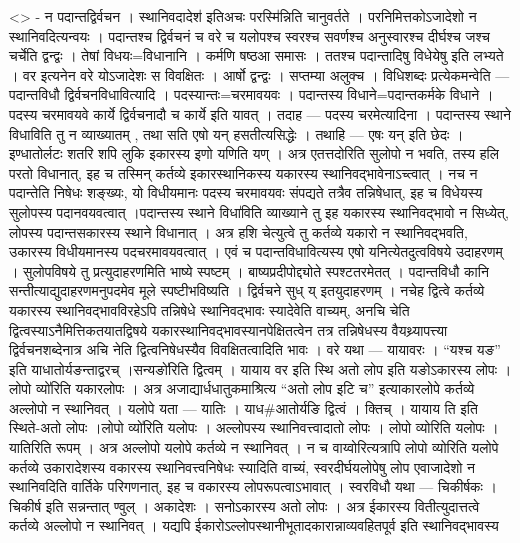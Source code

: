 \textless{}\textgreater{} - न पदान्तद्विर्वचन । स्थानिवदादेश॑ इतिअचः
परस्मि॑न्निति चानुवर्तते । परनिमित्तकोऽजादेशो न स्थानिवदित्यन्वयः ।
पदान्तश्च द्विर्वचनं च वरे च यलोपश्च स्वरश्च सवर्णश्च अनुस्वारश्च
दीर्घश्च जश्च चर्चेति द्वन्द्वः । तेषां विधयः=विधानानि । कर्मणि षष्ठआ
समासः । ततश्च पदान्तादिषु विधेयेषु इति लभ्यते । वर इत्यनेन वरे योऽजादेशः
स विवक्षितः । आर्षो द्वन्द्वः । सप्तम्या अलुक्च । विधिशब्दः
प्रत्येकमन्वेति --- पदान्तविधौ द्विर्वचनविधावित्यादि ।
पदस्यान्तः=चरमावयवः । पदान्तस्य विधाने=पदान्तकर्मके विधाने । पदस्य
चरमावयवे कार्ये द्विर्वचनादौ च कार्ये इति यावत् । तदाह --- पदस्य
चरमेत्यादिना । पदान्तस्य स्थाने विधाविति तु न व्याख्यातम् , तथा सति एषो
यन् हसतीत्यसिद्धेः । तथाहि --- एषः यन् इति छेदः । इण्धातोर्लटः शतरि शपि
लुकि इकारस्य इणो यणिति यण् । अत्र एतत्तदोरिति सुलोपो न भवति, तस्य हलि
परतो विधानात्, इह च तस्मिन् कर्तव्ये इकारस्थानिकस्य यकारस्य
स्थानिवद्भावेनाऽच्त्वात् । नच न पदान्तेति निषेधः शङ्ख्यः, यो विधीयमानः
पदस्य चरमावयवः संपद्यते तत्रैव तन्निषेधात्, इह च विधेयस्य सुलोपस्य
पदानवयवत्वात् ।पदान्तस्य स्थाने विधा॑विति व्याख्याने तु इह यकारस्य
स्थानिवद्भावो न सिध्येत्, लोपस्य पदान्तसकारस्य स्थाने विधानात् । अत्र
हशि चेत्युत्वे तु कर्तव्ये यकारो न स्थानिवद्भवति, उकारस्य विधीयमानस्य
पदचरमावयवत्वात् । एवं च पदान्तविधावित्यस्य एषो यनित्येतदुत्वविषये
उदाहरणम् । सुलोपविषये तु प्रत्युदाहरणमिति भाष्ये स्पष्टम् ।
बाष्यप्रदीपोद्द्योते स्पश्टतरमेतत् । पदान्तविधौ कानि
सन्तीत्याद्युदाहरणमनुपदमेव मूले स्पष्टीभविष्यति । द्विर्वचने सुध् य्
इतयुदाहरणम् । नचेह द्वित्वे कर्तव्ये यकारस्य स्थानिवद्भावविरहेऽपि
तन्निषेधे स्थानिवद्भावः स्यादेवेति वाच्यम्, अनचि चेति
द्वित्वस्याऽनैमित्तिकतयातद्विषये यकारस्थानिवद्भावस्यानपेक्षितत्वेन तत्र
तन्निषेधस्य वैयथ्र्यापत्त्या द्विर्वचनशब्देनात्र अचि नेति
द्वित्वनिषेधस्यैव विवक्षितत्वादिति भावः । वरे यथा --- यायावरः । ``यश्च
यङ'' इति याधातोर्यङन्ताद्वरच् ।सन्यङो॑रिति द्वित्वम् । यायाय वर इति स्थि
अतो लोप इति यङोऽकारस्य लोपः ।लोपो व्यो॑रिति यकारलोपः । अत्र
अजाद्यार्धधातुकमाश्रित्य ``अतो लोप इटि च'' इत्याकारलोपे कर्तव्ये अल्लोपो
न स्थानिवत् । यलोपे यता --- यातिः । याध\#आतोर्यङि द्वित्वं । क्तिच् ।
यायाय ति इति स्थिते-अतो लोपः ।लोपो व्यो॑रिति यलोपः । अल्लोपस्य
स्थानिवत्त्वादातो लोपः । लोपो व्योरिति यलोपः । यातिरिति रूपम् । अत्र
अल्लोपो यलोपे कर्तव्ये न स्थानिवत् । न च वाय्वोरित्यत्रापि लोपो व्योरिति
यलोपे कर्तव्ये उकारादेशस्य वकारस्य स्थानिवत्त्वनिषेधः स्यादिति वाच्यं,
स्वरदीर्घयलोपेषु लोप एवाजादेशो न स्थानिवदिति वार्तिके परिगणनात्, इह च
वकारस्य लोपरूपत्वाऽभावात् । स्वरविधौ यथा --- चिकीर्षकः । चिकीर्ष इति
सन्नन्तात् ण्वुल् । अकादेशः । सनोऽकारस्य अतो लोपः । अत्र ईकारस्य
वितीत्युदात्तत्वे कर्तव्ये अल्लोपो न स्थानिवत् । यद्यपि
ईकारोऽल्लोपस्थानीभूतादकारान्नाव्यवहितपूर्व इति स्थानिवद्भावस्य
